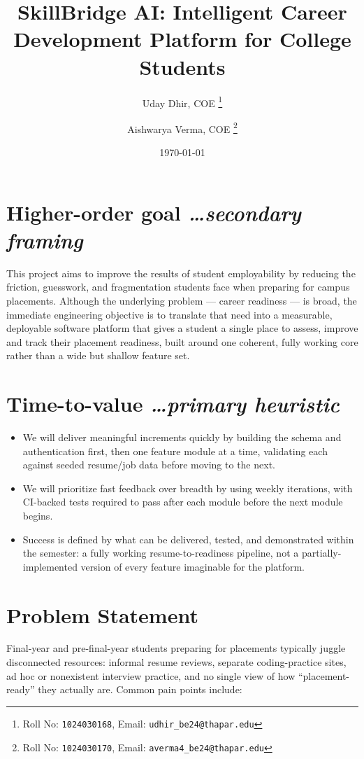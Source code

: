 \documentclass[11pt,a4paper]{article}
\title{SkillBridge AI: Intelligent Career Development Platform for College Students}
\author{
  Uday Dhir, COE%
  \thanks{Roll No: \texttt{1024030168}, %
    Email: \texttt{udhir\_be24@thapar.edu}}
  \and 
  Aishwarya Verma, COE%
  \thanks{Roll No: \texttt{1024030170}, %
    Email: \texttt{averma4\_be24@thapar.edu}}
}
\date{\today}
\newcommand{\BvrHint}[1]{%
  {\normalfont\normalsize\itshape\hfill #1}}
\begin{document}
\maketitle

\section{Higher-order goal%
  \BvrHint{\ldots secondary framing}}
This project aims to improve the results of student employability by reducing the friction, guesswork, and
fragmentation students face when preparing for campus placements. Although the underlying problem —
career readiness — is broad, the immediate engineering objective is to translate that need into a
measurable, deployable software platform that gives a student a single place to assess, improve and
track their placement readiness, built around one coherent, fully working core rather than a wide but
shallow feature set.

\section{Time-to-value %
\BvrHint{\ldots primary heuristic}}
\begin{itemize}[leftmargin=0.7cm]
    \item We will deliver meaningful increments quickly by building the schema and authentication first, then one feature module at a time, validating each against seeded resume/job data before moving to the next.
    \item We will prioritize fast feedback over breadth by using weekly iterations, with CI-backed tests required to pass after each module before the next module begins.
    \item Success is defined by what can be delivered, tested, and demonstrated within the semester: a fully working resume-to-readiness pipeline, not a partially-implemented version of every feature imaginable
    for the platform.
\end{itemize}

\section{Problem Statement}
Final-year and pre-final-year students preparing for placements typically juggle disconnected resources: informal resume reviews, separate coding-practice sites, ad hoc or nonexistent interview practice, and no single view of how “placement-ready” they actually are. Common pain points include:
\end{document}

